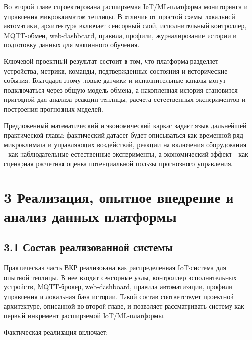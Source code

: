 \documentclass[a4paper,14pt]{extarticle}
\begin{document}
Во второй главе спроектирована расширяемая IoT/ML-платформа мониторинга
и управления микроклиматом теплицы. В отличие от простой схемы локальной
автоматики, архитектура включает сенсорный слой, исполнительный
контроллер, MQTT-обмен, web-dashboard, правила, профили, журналирование
истории и подготовку данных для машинного обучения.

Ключевой проектный результат состоит в том, что платформа разделяет
устройства, метрики, команды, подтвержденные состояния и исторические
события. Благодаря этому новые датчики и исполнительные каналы могут
подключаться через общую модель обмена, а накопленная история становится
пригодной для анализа реакции теплицы, расчета естественных
экспериментов и построения прогнозных моделей.

Предложенный математический и экономический каркас задает язык
дальнейшей практической главы: фактический датасет будет описываться как
временной ряд микроклимата и управляющих воздействий, реакции на
включения оборудования - как наблюдательные естественные эксперименты, а
экономический эффект - как сценарная расчетная оценка потенциальной
пользы прогнозного управления.

\section{3 Реализация, опытное внедрение и анализ данных
платформы}\label{ux440ux435ux430ux43bux438ux437ux430ux446ux438ux44f-ux43eux43fux44bux442ux43dux43eux435-ux432ux43dux435ux434ux440ux435ux43dux438ux435-ux438-ux430ux43dux430ux43bux438ux437-ux434ux430ux43dux43dux44bux445-ux43fux43bux430ux442ux444ux43eux440ux43cux44b}

\subsection{3.1 Состав реализованной
системы}\label{ux441ux43eux441ux442ux430ux432-ux440ux435ux430ux43bux438ux437ux43eux432ux430ux43dux43dux43eux439-ux441ux438ux441ux442ux435ux43cux44b}

Практическая часть ВКР реализована как распределенная IoT-система для
опытной теплицы. В нее входят сенсорные узлы, контроллер исполнительных
устройств, MQTT-брокер, web-dashboard, правила автоматизации, профили
управления и локальная база истории. Такой состав соответствует
проектной архитектуре, описанной во второй главе, и позволяет
рассматривать систему как первый инкремент расширяемой IoT/ML-платформы.

Фактическая реализация включает:
\end{document}
